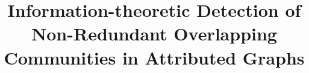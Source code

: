 \documentclass{sig-alternate}
\begin{document}
%

\title{Information-theoretic Detection of Non-Redundant Overlapping Communities in Attributed Graphs}
%
%
%
%
%
\end{document}
